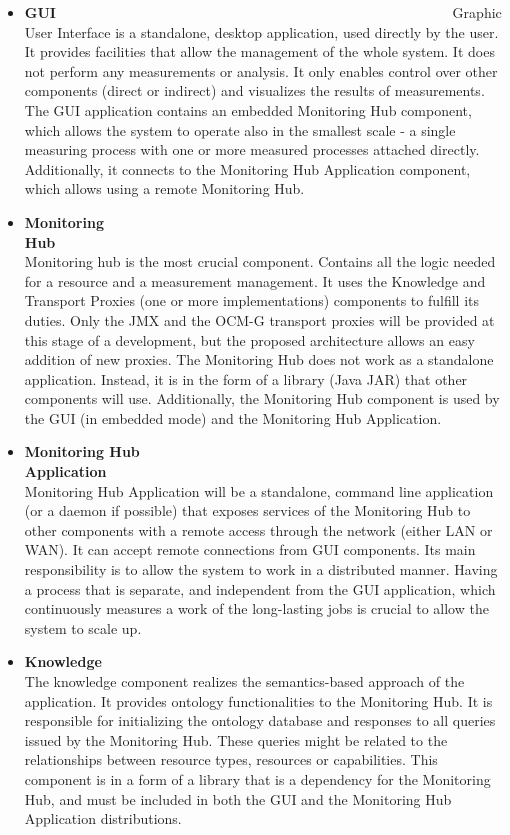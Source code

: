 \begin{itemize}

\item {\bf GUI}~~~~~~~~~~~~~~~~~~~~~~~~~~~~~~~~~~~~~~~~~~~~~~~~~~~~~~~~\linebreak
Graphic User Interface is a standalone, desktop application, used directly by the user. It provides facilities that allow the management of the whole system. It does not perform any measurements or analysis. It only enables control over other components (direct or indirect) and visualizes the results of measurements.
The GUI application contains an embedded Monitoring Hub component, which allows the system to operate also in the smallest scale - a single measuring process with one or more measured processes attached directly. Additionally, it connects to the Monitoring Hub Application component, which allows using a remote Monitoring Hub.

\item {\bf Monitoring Hub}~~~~~~~~~~~~~~~~~~~~~~~~~~~~~~~~~~~~~~~~~~~~~~~~~~~~~~~~\linebreak
Monitoring hub is the most crucial component. Contains all the logic needed for a resource and a measurement management. It uses the Knowledge and Transport Proxies (one or more implementations) components to fulfill its duties. Only the JMX and the OCM-G transport proxies will be provided at this stage of a development, but the proposed architecture allows an easy addition of new proxies.
The Monitoring Hub does not work as a standalone application. Instead, it is in the form of a library (Java JAR) that other components will use. Additionally, the Monitoring Hub component is used by the GUI (in embedded mode) and the Monitoring Hub Application.

\item {\bf Monitoring Hub Application}~~~~~~~~~~~~~~~~~~~~~~~~~~~~~~~~~~~~~~~~~~~~~~~~~~~~~~~~\linebreak
Monitoring Hub Application will be a standalone, command line application (or a daemon if possible) that exposes services of the Monitoring Hub to other components with a remote access through the network (either LAN or WAN). It can accept remote connections from GUI components.
Its main responsibility is to allow the system to work in a distributed manner. Having a process that is separate, and independent from the GUI application, which continuously measures a work of the long-lasting jobs is crucial to allow the system to scale up.


\item {\bf Knowledge}~~~~~~~~~~~~~~~~~~~~~~~~~~~~~~~~~~~~~~~~~~~~~~~~~~~~~~~~\linebreak
The knowledge component realizes the semantics-based approach of the application. It provides ontology functionalities to the Monitoring Hub. It is responsible for initializing the ontology database and responses to all queries issued by the Monitoring Hub. These queries might be related to the relationships between resource types, resources or capabilities. This component is in a form of a library that is a dependency for the Monitoring Hub, and must be included in both the GUI and the Monitoring Hub Application distributions.


\end{itemize}
